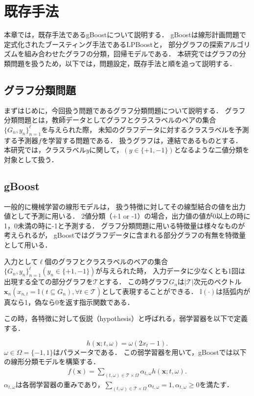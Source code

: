 \chapter{既存手法}
本章では，既存手法であるgBoost\cite{gBoost}について説明する．
gBoostは線形計画問題で定式化されたブースティング手法であるLPBoost\cite{lpboost}と，
部分グラフの探索アルゴリズムを組み合わせたグラフの分類，回帰モデルである．
本研究ではグラフの分類問題を扱うため，以下では，問題設定，既存手法と順を追って説明する．

\section{グラフ分類問題}
まずはじめに，今回扱う問題であるグラフ分類問題について説明する．
グラフ分類問題とは，教師データとしてグラフとクラスラベルのペアの集合$\{G_n, y_n\}^{\ell}_{n=1}$を与えられた際，
未知のグラフデータに対するクラスラベルを予測する予測器$f$を学習する問題である．
扱うグラフは，連結であるものとする．
本研究では，クラスラベル$y$に関して，$(y \in \{+1, -1\})$となるような二値分類を対象として扱う．

\section{gBoost}
一般的に機械学習の線形モデルは，
扱う特徴に対してその線型結合の値を出力値として予測に用いる．
2値分類（+1 or -1）の場合，出力値の値が0以上の時に1，0未満の時に-1と予測する．
グラフ分類問題に用いる特徴量は様々なものが考えられるが，
gBoostではグラフデータに含まれる部分グラフの有無を特徴量として用いる．

入力として$\ell$個のグラフとクラスラベルのペアの集合
$\{G_n, y_n\}^{\ell}_{n=1} (y_n \in \{+1, -1\})$が与えられた時，
入力データに少なくとも1回は出現する全ての部分グラフを$\mathcal{T}$とする．
この時グラフ$G_n$は$|\mathcal{T}|$次元のベクトル$\bm{x}_n(x_{n,t} = \mathbb{I}(t \subseteq G_n), \forall t \in \mathcal{T})$として表現することができる．
$\mathbb{I}(\cdot)$は括弧内が真なら1，偽なら0を返す指示関数である．

この時，各特徴に対して仮説（hypothesis）と呼ばれる，弱学習器を以下で定義する．

\begin{equation*}
	h(\bm{x};t,\omega) = \omega (2x_t - 1).
\end{equation*}
$\omega \in \Omega = \{-1,1\}$はパラメータである．
この弱学習器を用いて，gBoostでは以下の線形分類モデルを構築する．
\begin{align}
	\label{eq:linear}
	f(\bm{x}) = \sum_{(t,\omega) \in \mathcal{T}\times \Omega} \alpha_{t,\omega} h(\bm{x};t,\omega).
\end{align}
$\alpha_{t,\omega}$は各弱学習器の重みであり，$\sum_{(t,\omega) \in \mathcal{T}\times \Omega} \alpha_{t,\omega}=1,\alpha_{t,\omega} \geq 0$を満たす．

